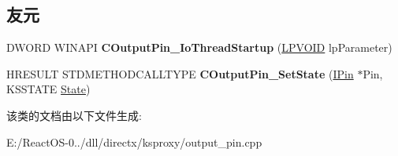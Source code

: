 \subsection*{友元}
\begin{DoxyCompactItemize}
\item 
\mbox{\label{class_c_output_pin_a10770d26c70c340f3a85a7938b085c99}} 
D\+W\+O\+RD W\+I\+N\+A\+PI {\bfseries C\+Output\+Pin\+\_\+\+Io\+Thread\+Startup} (\hyperlink{interfacevoid}{L\+P\+V\+O\+ID} lp\+Parameter)
\item 
\mbox{\label{class_c_output_pin_a20a1c3c7113649cd2c73556eac5feabe}} 
H\+R\+E\+S\+U\+LT S\+T\+D\+M\+E\+T\+H\+O\+D\+C\+A\+L\+L\+T\+Y\+PE {\bfseries C\+Output\+Pin\+\_\+\+Set\+State} (\hyperlink{interface_i_pin}{I\+Pin} $\ast$Pin, K\+S\+S\+T\+A\+TE \hyperlink{struct_state}{State})
\end{DoxyCompactItemize}


该类的文档由以下文件生成\+:\begin{DoxyCompactItemize}
\item 
E\+:/\+React\+O\+S-\/0../dll/directx/ksproxy/output\+\_\+pin.\+cpp\end{DoxyCompactItemize}
